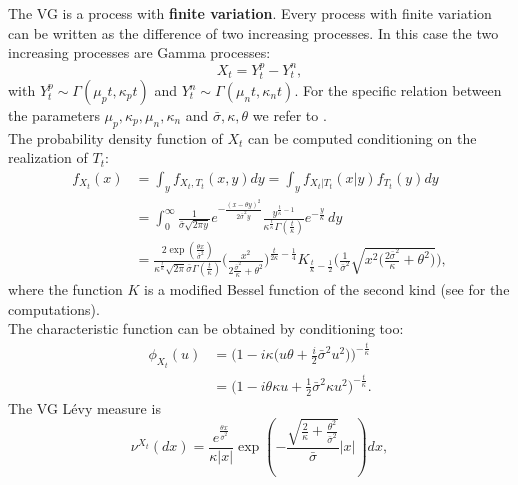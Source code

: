 The VG is a process with \textbf{finite variation}. Every process with finite variation can be written as the difference of two increasing 
processes. In this case the two increasing processes are Gamma processes:
\begin{equation}
 X_t = Y^p_t - Y^n_t,
\end{equation}
with $Y^p_t \sim \Gamma(\mu_p t, \kappa_p t)$ and $Y^n_t \sim \Gamma(\mu_n t, \kappa_n t)$. For the specific relation between the parameters
$\mu_p,\kappa_p,\mu_n,\kappa_n$ and $\bar\sigma,\kappa,\theta$ we refer to \cite{MCC98}.\\
\newline
The probability density function of $X_t$ can be computed conditioning on the realization of $T_t$:
\begin{align}\label{VG_density}
 f_{X_t}(x) &= \int_y f_{X_t,T_t}(x,y) dy = \int_y f_{X_t|T_t}(x|y) f_{T_t}(y) dy \\ \nonumber
         &= \int_0^{\infty} \frac{1}{\bar\sigma \sqrt{2\pi y}} e^{-\frac{(x -\theta y)^2}{2\bar\sigma^2 y}}
         \frac{y^{\frac{t}{\kappa} -1}}{\kappa^{\frac{t}{\kappa}} \Gamma(\frac{t}{\kappa})}
          e^{-\frac{y}{\kappa}} \, dy \\ \nonumber
         &= \frac{2 \exp(\frac{\theta x}{\bar\sigma^2})}{\kappa^{\frac{t}{\kappa}} \sqrt{2\pi}\bar\sigma \Gamma(\frac{t}{\kappa}) }
            \biggl( \frac{x^2}{2\frac{\bar\sigma^2}{\kappa} + \theta^2} \biggr)^{\frac{t}{2\kappa}-\frac{1}{4}} 
            K_{\frac{t}{\kappa}-\frac{1}{2}} 
            \biggl( \frac{1}{\bar\sigma^2} \sqrt{x^2 \bigl(\frac{2\bar\sigma^2}{\kappa}+\theta^2 \bigr)} \biggr),
\end{align}
where the function $K$ is a modified Bessel function of the second kind (see \cite{MCC98} for the computations).\\
The characteristic function can be obtained by conditioning too: 
\begin{align*}
 \phi_{X_t}(u) &= \biggl( 1-i \kappa \bigl( u\theta +\frac{i}{2}\bar\sigma^2 u^2 \bigr) \biggr)^{-\frac{t}{\kappa}} \\  
	       &= \biggl( 1-i\theta \kappa u + \frac{1}{2} \bar\sigma^2 \kappa u^2 \biggr)^{-\frac{t}{\kappa}}.
\end{align*}
\newline
The VG Lévy measure is
\begin{equation}\label{VG_measure}
 \nu^{X_t}(dx) = \frac{e^{\frac{\theta x}{\bar\sigma^2}}}{\kappa|x|} \exp 
 \left( - \frac{\sqrt{\frac{2}{\kappa} + \frac{\theta^2}{\bar\sigma^2}}}{\bar\sigma} |x|\right) dx,
\end{equation}
